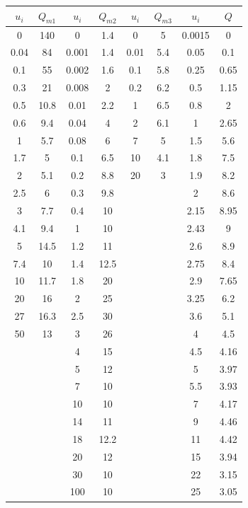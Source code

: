 \documentclass{report}
\begin{document}
\begin{tabular}{|c|c||c|c||c|c||c|c|}
\hline 
$u_i$ & $Q_{m1}$ & $u_i$ & $Q_{m2}$ & $u_i$ & $Q_{m3}$ & $u_i$ & $Q$ \\ 
\hline
0    & 140  & 0     & 1.4  & 0    & 5   & 0.0015 & 0    \\
0.04 & 84   & 0.001 & 1.4  & 0.01 & 5.4 & 0.05   & 0.1  \\
0.1  & 55   & 0.002 & 1.6  & 0.1  & 5.8 & 0.25   & 0.65 \\
0.3  & 21   & 0.008 & 2    & 0.2  & 6.2 & 0.5    & 1.15 \\
0.5  & 10.8 & 0.01  & 2.2  & 1    & 6.5 & 0.8    & 2    \\
0.6  & 9.4  & 0.04  & 4    & 2    & 6.1 & 1      & 2.65 \\
1    & 5.7  & 0.08  & 6    & 7    & 5   & 1.5    & 5.6  \\
1.7  & 5    & 0.1   & 6.5  & 10   & 4.1 & 1.8    & 7.5  \\
2    & 5.1  & 0.2   & 8.8  & 20   & 3   & 1.9    & 8.2  \\
2.5  & 6    & 0.3   & 9.8  &      &     & 2      & 8.6  \\
3    & 7.7  & 0.4   & 10   &      &     & 2.15   & 8.95 \\
4.1  & 9.4  & 1     & 10   &      &     & 2.43   & 9    \\
5    & 14.5 & 1.2   & 11   &      &     & 2.6    & 8.9  \\
7.4  & 10   & 1.4   & 12.5 &      &     & 2.75   & 8.4  \\
10   & 11.7 & 1.8   & 20   &      &     & 2.9    & 7.65 \\
20   & 16   & 2     & 25   &      &     & 3.25   & 6.2  \\
27   & 16.3 & 2.5   & 30   &      &     & 3.6    & 5.1  \\
50   & 13   & 3     & 26   &      &     & 4      & 4.5  \\
     &      & 4     & 15   &      &     & 4.5    & 4.16 \\
     &      & 5     & 12   &      &     & 5      & 3.97 \\
     &      & 7     & 10   &      &     & 5.5    & 3.93 \\
     &      & 10    & 10   &      &     & 7      & 4.17 \\
     &      & 14    & 11   &      &     & 9      & 4.46 \\
     &      & 18    & 12.2 &      &     & 11     & 4.42 \\
     &      & 20    & 12   &      &     & 15     & 3.94 \\
     &      & 30    & 10   &      &     & 22     & 3.15 \\
     &      & 100   & 10   &      &     & 25     & 3.05 \\
\hline
\end{tabular}
\end{document}
